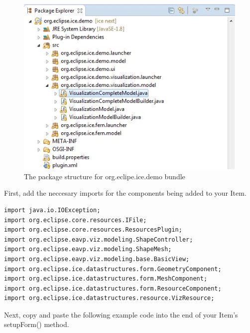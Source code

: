 \begin{figure}[!h]
\includegraphics[width=\textwidth]{images/DemoPackageStructure}
\centering
\caption{The package structure for org.eclipe.ice.demo bundle}
\label{fig:demostructure}
\end{figure}

First, add the neccesary imports for the components being added to your Item. 

\begin{verbatim}
import java.io.IOException;
import org.eclipse.core.resources.IFile;
import org.eclipse.core.resources.ResourcesPlugin;
import org.eclipse.eavp.viz.modeling.ShapeController;
import org.eclipse.eavp.viz.modeling.ShapeMesh;
import org.eclipse.eavp.viz.modeling.base.BasicView;
import org.eclipse.ice.datastructures.form.GeometryComponent;
import org.eclipse.ice.datastructures.form.MeshComponent;
import org.eclipse.ice.datastructures.form.ResourceComponent;
import org.eclipse.ice.datastructures.resource.VizResource;
\end{verbatim}

Next, copy and paste the following example code into the end of your Item's
setupForm() method.

